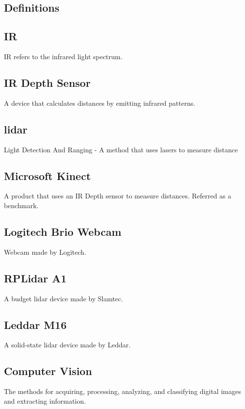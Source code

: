 \documentclass[onecolumn, draftclsnofoot,10pt, compsoc]{IEEEtran}
\begin{document}
\begin{singlespace}
	\section{Definitions}
		\subsection{IR}\label{def:IR}
		IR refers to the infrared light spectrum.

		\subsection{IR Depth Sensor}\label{def:depthsensor}
		A device that calculates distances by emitting infrared patterns. 
		
		\subsection{lidar}\label{def:lidar}
		Light Detection And Ranging - A method that uses lasers to measure distance
		
		\subsection{Microsoft Kinect}\label{def:kinect}
		A product that uses an IR Depth sensor to measure distances.
		Referred as a benchmark.
		
		\subsection{Logitech Brio Webcam}\label{def:brio}
		Webcam made by Logitech. \cite{logitech}
		
		\subsection{RPLidar A1}\label{def:rplidar}
		A budget lidar device made by Slamtec. \cite{slamtec}

		\subsection{Leddar M16}\label{def:m16}
		A solid-state lidar device made by Leddar. \cite{Leddartech}

		\subsection{Computer Vision }\label{def:vision}
		The methods for acquiring, processing, analyzing, and classifying digital images and extracting information.


\end{singlespace}
\end{document}
